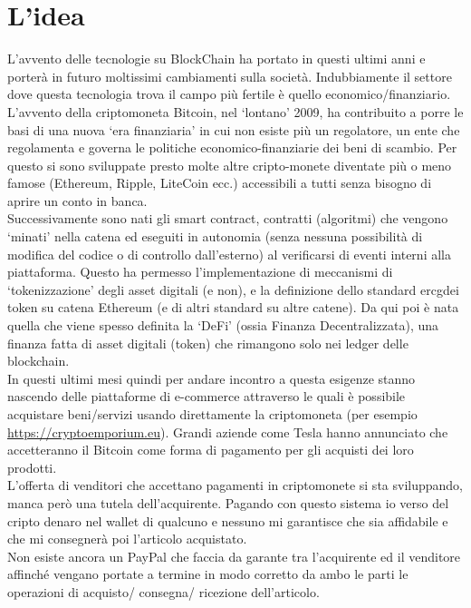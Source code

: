 \section{L'idea}
L’avvento delle tecnologie su BlockChain ha portato in questi ultimi anni e porterà in futuro moltissimi cambiamenti sulla società. Indubbiamente il settore dove questa tecnologia trova il campo più fertile è quello economico/finanziario. L’avvento della criptomoneta Bitcoin, nel ‘lontano’ 2009, ha contribuito a porre le basi di una nuova ‘era finanziaria’ in cui non esiste più un regolatore, un ente che regolamenta e governa le politiche economico-finanziarie dei beni di scambio. Per questo si sono sviluppate presto molte altre cripto-monete diventate più o meno famose (Ethereum, Ripple, LiteCoin ecc.) accessibili a tutti senza bisogno di aprire un conto in banca.\\
Successivamente sono nati gli smart contract, contratti (algoritmi) che vengono ‘minati’ nella catena ed eseguiti in autonomia (senza nessuna possibilità di modifica del codice o di controllo dall’esterno) al verificarsi di eventi interni alla piattaforma. Questo ha permesso l’implementazione di meccanismi di ‘tokenizzazione’ degli asset digitali (e non), e la definizione dello standard \gls{ercg}\glsfirstoccur  dei token su catena Ethereum (e di altri standard su altre catene). Da qui poi è nata quella che viene spesso definita la ‘DeFi’ (ossia Finanza Decentralizzata), una finanza fatta di asset digitali (token) che rimangono solo nei ledger delle blockchain.\\
In questi ultimi mesi quindi per andare incontro a questa esigenze stanno nascendo delle piattaforme di e-commerce attraverso le quali è possibile acquistare beni/servizi usando direttamente la criptomoneta (per esempio
\href{https://cryptoemporium.eu}{https://cryptoemporium.eu}). Grandi aziende come Tesla hanno annunciato che accetteranno il Bitcoin come forma di pagamento per gli acquisti dei loro prodotti.\\
L’offerta di venditori che accettano pagamenti in criptomonete si sta sviluppando, manca però una tutela dell’acquirente. Pagando con questo sistema io verso del cripto denaro nel wallet di qualcuno e nessuno mi garantisce che sia affidabile e che mi consegnerà poi l’articolo acquistato.\\
Non esiste ancora un PayPal che faccia da garante tra l’acquirente ed il venditore affinché vengano portate a termine in modo corretto da ambo le parti le operazioni di acquisto/ consegna/ ricezione dell’articolo.\\
